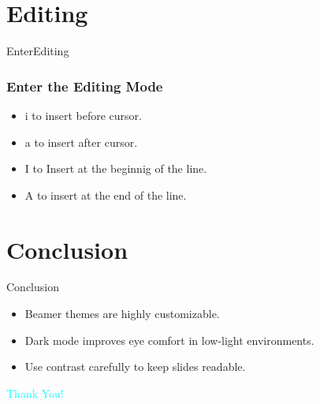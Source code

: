 \documentclass{beamer}
\begin{document}
\section{Editing}
\begin{frame}{EnterEditing}
    \frametitle{Enter the Editing Mode}
    \begin{itemize}
        \item \textsf{i} to \textsf{i}nsert before cursor.
        \item \textsf{a} to insert \textsf{a}fter cursor.
        \item \textsf{I} to \textsf{I}nsert at the beginnig of the line.
        \item \textsf{A} to insert \textsf{a}t the end of the line.
    \end{itemize}
\end{frame}

\section{Conclusion}
\begin{frame}{Conclusion}
    \begin{itemize}
        \item Beamer themes are highly customizable.
        \item Dark mode improves eye comfort in low-light environments.
        \item Use contrast carefully to keep slides readable.
    \end{itemize}
\end{frame}

\begin{frame}
    \centering
    {\Huge \textcolor{cyan}{Thank You!}}
\end{frame}
\end{document}
